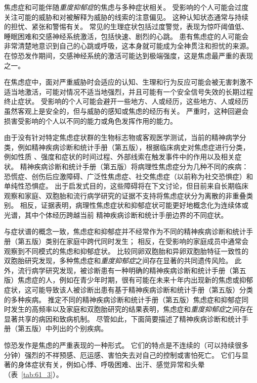 焦虑症和可能伴随\textit{重度抑郁症}的焦虑与多种症状相关。
受影响的个人可能会过度关注可能的威胁和对被解释为威胁的线索的注意偏见。
这种认知状态通常与持续的担忧、紧张和警惕有关。
常见的生理症状包括过度警觉，表现为惊吓阈值低、睡眠困难和交感神经系统激活，包括快速、剧烈的心跳。
患有焦虑症的人可能会非常清楚地意识到自己的心跳或呼吸，这本身就可能成为全神贯注和担忧的来源。
在惊恐发作期间，交感神经系统的激活可能达到极端强度，这是焦虑最严重的表现之一。


在焦虑症中，面对严重威胁时会适应的认知、生理和行为反应可能会被无害刺激不适当地激活，可能对情况不适当地强烈，并且可能有一个安全信号失效的长期过程 终止症状。
受影响的个人可能会避开一些地方、人或经历，这些地方、人或经历虽然客观上是安全的，但与威胁的感知或焦虑的经历有关。
严重时，这种回避会损害受影响的个人以不同的能力或角色发挥作用的能力。


由于没有针对特定焦虑症状群的生物标志物或客观医学测试，当前的精神病学分类，例如精神疾病诊断和统计手册（第五版），根据临床病史对焦虑症进行分类，例如性质 、强度和症状的时间过程、外部线索在触发事件中的作用以及相关症状。
精神疾病诊断和统计手册（第五版）将病理性焦虑症分为几种不同的疾病：恐慌症、创伤后应激障碍、广泛性焦虑症、社交焦虑症（以前称为社交恐惧症）和单纯性恐惧症。
出于启发式目的，这些障碍将在下文讨论，但目前来自长期临床观察和家庭、双胞胎和流行病学研究的证据不支持将焦虑症状分为离散的非重叠类别。
相反，证据表明，病理性焦虑症状和抑郁症状可能更好地概念化为连续体或光谱，其中个体经历跨越当前 精神疾病诊断和统计手册边界的不同症状。


与症状谱的概念一致，焦虑症和抑郁症并不经常作为不同的精神疾病诊断和统计手册（第五版）类别在家庭中跨代同时发生；
相反，在受影响的家庭成员中通常会观察到不同模式的焦虑和抑郁症状。
比较同卵双胞胎和异卵双胞胎特征一致性的双胞胎研究发现，多种焦虑症和\textit{重度抑郁症}之间存在显著的共同遗传风险。
此外，流行病学研究发现，被诊断患有一种明确的精神疾病诊断和统计手册（第五版）焦虑症的人，例如在青少年时期，很有可能在未来十年内出现新的焦虑或抑郁症状，这可能导致该人被诊断出患有基于精神疾病诊断和统计手册（第五版）分类的多种疾病。
推定不同的精神疾病诊断和统计手册（第五版）焦虑症和抑郁症同时发生的高频率以及家庭和双胞胎研究的结果表明，焦虑症和\textit{重度抑郁症}之间存在显著共享的病因和致病机制。
尽管如此，下面简要描述了精神疾病诊断和统计手册（第五版）中列出的个别疾病。


惊恐发作是焦虑的严重表现的一种形式。
它们的特点是不连续的（可以持续很多分钟）强烈的不祥预感、厄运感、害怕失去对自己的控制或害怕死亡。
它们与显著的身体症状有关，例如心悸、呼吸困难、出汗、感觉异常和头晕（表~\ref{tab:61_3}）。


